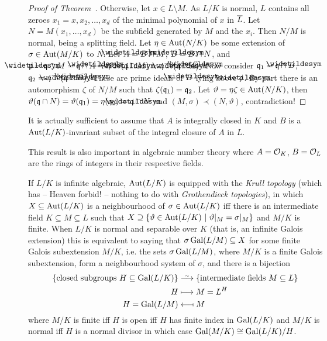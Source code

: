 \documentclass[a4paper,parskip=half,numbers=enddot, DIV=12]{scrreprt}
\begin{document}
\begin{proof}[Proof of Theorem~]
		Otherwise, let $x\in L\setminus M$. As $L/K$ is normal, $L$ contains all zeroes $x_1=x,x_2,\ldots, x_d$ of the minimal polynomial of $x$ in $\overline L$. Let $N=M(x_1,\ldots,x_d)$ be the subfield generated by $M$ and the $x_i$. Then $N/M$ is normal, being a splitting field. Let $\eta\in \operatorname{Aut}(N/K)$ be some extension of $\sigma\in \operatorname{Aut}(M/K)$ to $N$. Let $\snake A = B\cap M$, $\snake B = B\cap N$, and $\snake\pp = \qq\cap M  =\qq\cap \snake A = \eta^{-1}\left(\snake \qq\cap M\right) = \eta^{-1}\big(\snake\qq\cap \snake A\big)$. Now consider $\qq_1=\qq\cap \snake B$, $\qq_2=\eta^{-1}\big(\snake \qq\cap\snake B\big)$. These are prime ideals of $\snake B$ lying above $\snake \pp$. By part  there is an automorphism $\zeta$ of $N/M$ such that $\zeta(\mathfrak{q}_1) = \mathfrak{q}_2$. Let $\vartheta = \eta\zeta\in \operatorname{Aut}(N/K)$, then $\vartheta(\qq\cap N) = \vartheta(\qq_1) = \eta(\qq_2) = \snake\qq\cap N$ and $(M,\sigma)\prec (N,\vartheta)$, contradiction!
	\end{proof}
	\begin{rem*}
		\begin{alphanumerate}
		\item
			It is actually sufficient to assume that $A$ is integrally closed in $K$ and $B$ is a $\operatorname{Aut}(L/K)$-invariant subset of the integral closure of $A$ in $L$.
		\item
			This result is also important in algebraic number theory where $A=\mathcal{O}_K$, $B=\mathcal{O}_L$ are the rings of integers in their respective fields. 
		\item If $L/K$ is infinite algebraic, $\operatorname{Aut}(L/K)$ is equipped with the \emph{Krull topology} (which has -- Heaven forbid! -- nothing to do with \emph{Grothendieck topologies}), in which $X\subseteq \operatorname{Aut}(L/K)$ is a neighbourhood of $\sigma\in\operatorname{Aut}(L/K)$ iff there is an intermediate field $K\subseteq M\subseteq L$ such that $X\supseteq\left\{\vartheta \in \operatorname{Aut}(L/K)\ \middle|\  \vartheta|_M = \sigma|_M\right\}$ and $M/K$ is finite. When $L/K$ is normal and separable over $K$ (that is, an infinite Galois extension) this is equivalent to saying that $\sigma\operatorname{Gal}(L/M)\subseteq X$ for some finite Galois subextension $M/K$, i.e. the sets $\sigma\operatorname{Gal}(L/M)$, where $M/K$ is a finite Galois subextension, form a neighbourhood system of $\sigma$, and  there is a bijection 
		\begin{align*}
			\left\{\text{closed subgroups }H\subseteq \Gal(L/K)\right\}&\isomorphism\left\{\text{intermediate fields }M\subseteq L\right\}\\
			H&\longmapsto M= L^H\\
			H=\Gal(L/M) &\longmapsfrom M
		\end{align*}
		where $M/K$ is finite iff $H$ is open iff $H$ has finite index in $\operatorname{Gal}(L/K)$ and $M/K$ is normal iff $H$ is a normal divisor in which case $\operatorname{Gal}(M/K) \cong \operatorname{Gal}(L/K)/H$.
		\end{alphanumerate}
	\end{rem*}
\end{document}
